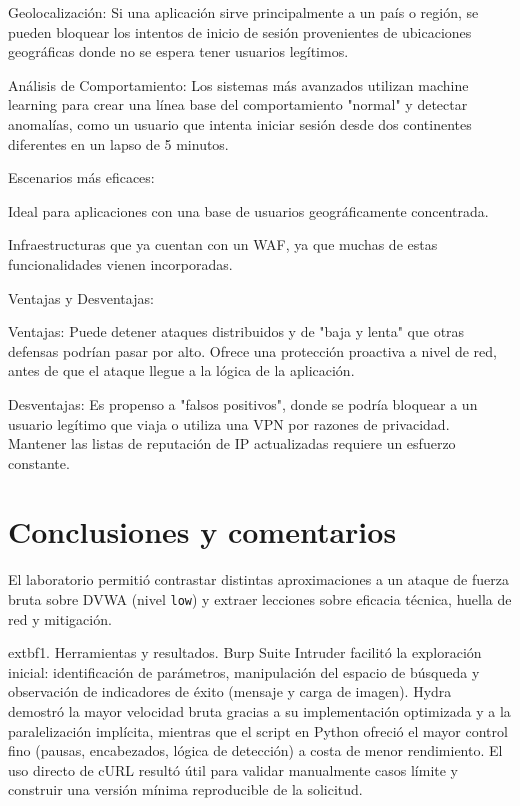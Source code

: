 \documentclass[letterpaper,12pt]{article}
\begin{document}
        Geolocalización: Si una aplicación sirve principalmente a un país o región, se pueden bloquear los intentos de inicio de sesión provenientes de ubicaciones geográficas donde no se espera tener usuarios legítimos.

        Análisis de Comportamiento: Los sistemas más avanzados utilizan machine learning para crear una línea base del comportamiento "normal" y detectar anomalías, como un usuario que intenta iniciar sesión desde dos continentes diferentes en un lapso de 5 minutos.

    Escenarios más eficaces:

        Ideal para aplicaciones con una base de usuarios geográficamente concentrada.

        Infraestructuras que ya cuentan con un WAF, ya que muchas de estas funcionalidades vienen incorporadas.

    Ventajas y Desventajas:

        Ventajas: Puede detener ataques distribuidos y de "baja y lenta" que otras defensas podrían pasar por alto. Ofrece una protección proactiva a nivel de red, antes de que el ataque llegue a la lógica de la aplicación.

        Desventajas: Es propenso a "falsos positivos", donde se podría bloquear a un usuario legítimo que viaja o utiliza una VPN por razones de privacidad. Mantener las listas de reputación de IP actualizadas requiere un esfuerzo constante.

\section*{Conclusiones y comentarios}
El laboratorio permitió contrastar distintas aproximaciones a un ataque de fuerza bruta sobre DVWA (nivel \texttt{low}) y extraer lecciones sobre eficacia técnica, huella de red y mitigación.

	extbf{1. Herramientas y resultados.} Burp Suite Intruder facilitó la exploración inicial: identificación de parámetros, manipulación del espacio de búsqueda y observación de indicadores de éxito (mensaje y carga de imagen). Hydra demostró la mayor velocidad bruta gracias a su implementación optimizada y a la paralelización implícita, mientras que el script en Python ofreció el mayor control fino (pausas, encabezados, lógica de detección) a costa de menor rendimiento. El uso directo de cURL resultó útil para validar manualmente casos límite y construir una versión mínima reproducible de la solicitud.
\end{document}
